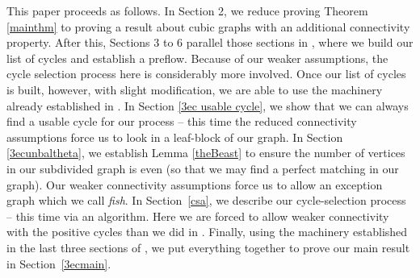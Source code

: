 \documentclass[12pt]{article}
\newcommand{\Z}{\mathbb{Z}}
\begin{document}
This paper proceeds as follows. In Section 2, we reduce proving Theorem \ref{mainthm} to proving a result about cubic graphs with an additional connectivity property. After this, Sections 3 to 6 parallel those sections in \cite{devos2023nowherezero}, where we build our list of cycles and establish a preflow. Because of our weaker assumptions, the cycle selection process here is considerably more involved. Once our list of cycles is built, however, with slight modification, we are able to use the machinery already established in \cite{devos2023nowherezero}.
In Section \ref{3ec usable cycle}, we show that we can always find a usable cycle for our process -- this time the reduced connectivity assumptions force us to look in a leaf-block of our graph. In Section \ref{3ecunbaltheta}, we establish Lemma \ref{theBeast} to ensure the number of vertices in our subdivided graph is even (so that we may %
find a perfect matching in our graph). Our weaker connectivity assumptions force us to allow an exception graph which we call \emph{fish}. In Section~\ref{csa}, we describe our cycle-selection process -- this time via an algorithm. Here we are forced to allow weaker connectivity with the positive cycles than we did in \cite{devos2023nowherezero}.
Finally, using the machinery established in the last three sections of \cite{devos2023nowherezero}, we put everything together to prove our main result in Section~\ref{3ecmain}.



\end{document}
